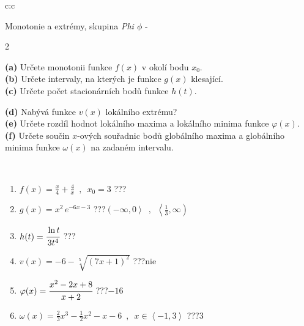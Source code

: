 \documentclass[10pt]{report}
\begin{document}
\newpage
\thispagestyle{empty}
\begin{tabular}{c:c}
\begin{minipage}[c][104.5mm][t]{0.5\linewidth}
\begin{center}
\vspace{7mm}
{\huge Monotonie a extrémy, skupina \textit{Phi $\phi$} -}\\[5mm]
\begin{minipage}{0.95\linewidth}
\begin{center}
{\small \begin{multicols}{2} \raggedright
\textbf{(a)} Určete monotonii funkce \(f(x)\) v okolí bodu \(x_0\). \\[1mm]
\textbf{(b)} Určete intervaly, na kterých je funkce \(g(x)\) klesající. \\[1mm]
\textbf{(c)} Určete počet stacionárních bodů funkce \(h(t)\). \par \columnbreak
\textbf{(d)} Nabývá funkce \(v(x)\) lokálního extrému? \\[1mm]
\textbf{(e)} Určete rozdíl hodnot lokálního maxima a lokálního minima funkce \(\varphi(x)\). \\[1mm]
\textbf{(f)} Určete součin \(x\)-ových souřadnic bodů globálního maxima a globálního minima funkce \(\omega(x)\) na zadaném intervalu. \\[1mm]
\end{multicols}
}
\end{center}
\end{minipage}
\\[4mm]
\begin{minipage}{0.79\linewidth}
\begin{center}
\begin{varwidth}{\linewidth}
\begin{enumerate}
\normalsize
\item $f(x)=\frac{x}{4}+\frac{4}{x} \enspace , \enspace x_0=3$\quad \dotfill\; ???\;\dotfill \quad {}
\item $g(x)=x^2\, e^{-6x-3}$\quad \dotfill\; ???\;\dotfill \quad $\left(-\infty , 0\right\rangle\enspace , \enspace \left\langle\frac{1}{3} , \infty\right)$
\item $h(t)=\cfrac{\ln t}{3t^4}$\quad \dotfill\; ???\;\dotfill {}
\item $v(x)=-6-\sqrt[5]{(7x+1)^2}$\quad \dotfill\; ???\;\dotfill \quad $\text{nie}$
\item $\varphi(x)=\cfrac{x^2-2x+8}{x+2}$\quad \dotfill\; ???\;\dotfill \quad $-16$
\item $\omega(x)=\frac{2}{3}x^3-\frac{1}{2}x^2-x-6 \enspace , \enspace x\in\left\langle-1 , 3\right\rangle$\quad \dotfill\; ???\;\dotfill \quad $3$

\end{enumerate}
\end{varwidth}
\end{center}
\end{minipage}
\end{center}
\end{minipage}
\end{tabular}
\end{document}
